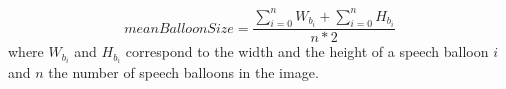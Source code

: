 \begin{equation}
  \label{eq:se:mean_balloon_size}
  meanBalloonSize = \frac{\sum\limits_{i=0}^n W_{b_i} + \sum\limits_{i=0}^n H_{b_i}}{n * 2}  
\end{equation}
where $W_{b_i}$ and $H_{b_i}$ correspond to the width and the height of a speech  balloon $i$ and $n$ the number of speech balloons in the image.










